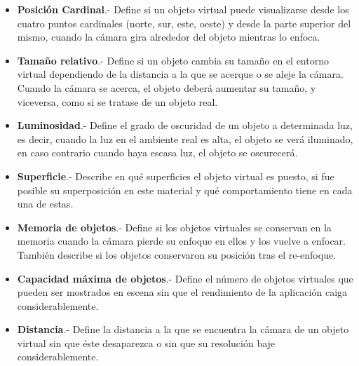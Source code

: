 \begin{itemize}
	\item \textbf{Posición Cardinal}.- Define si un objeto virtual puede visualizarse desde los cuatro puntos cardinales (norte, sur, este, oeste) y desde la parte superior del mismo, cuando la cámara gira alrededor del objeto mientras lo enfoca.
	\item \textbf{Tamaño relativo}.- Define si un objeto cambia su tamaño en el entorno virtual dependiendo de la distancia a la que se acerque o se aleje la cámara. Cuando la cámara se acerca, el objeto deberá aumentar su tamaño, y viceversa, como si se tratase de un objeto real.
	\item \textbf{Luminosidad}.- Define el grado de oscuridad de un objeto a determinada luz, es decir, cuando la luz en el ambiente real es alta, el objeto se verá iluminado, en caso contrario cuando haya escasa luz, el objeto se oscurecerá.
	\item \textbf{Superficie}.- Describe en qué superficies el objeto virtual es puesto, si fue posible su superposición en este material y qué comportamiento tiene en cada una de estas.
	\item \textbf{Memoria de objetos}.- Define si los objetos virtuales se conservan en la memoria cuando la cámara pierde su enfoque en ellos y los vuelve a enfocar. También describe si los objetos conservaron su posición tras el re-enfoque.
	\item \textbf{Capacidad máxima de objetos}.- Define el número de objetos virtuales que pueden ser mostrados en escena sin que el rendimiento de la aplicación caiga considerablemente.
	\item \textbf{Distancia}.- Define la distancia a la que se encuentra la cámara de un objeto virtual sin que éste desaparezca o sin que su resolución baje considerablemente.
\end{itemize}
\noindent


\noindent

\noindent

